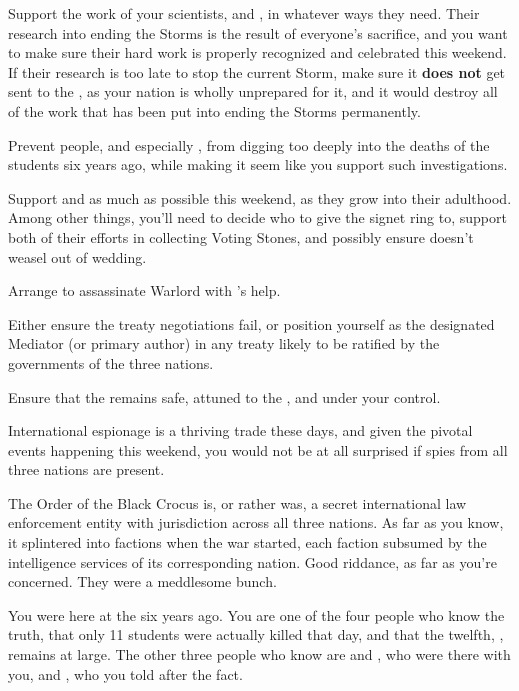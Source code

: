 \documentclass[char]{GL2020}
\begin{document}
\begin{itemz}
    \item Support the work of your scientists, \cHeadScientist{} and \cAssistantScientist{}, in whatever ways they need. Their research into ending the Storms is the result of everyone's sacrifice, and you want to make sure their hard work is properly recognized and celebrated this weekend. If their research is too late to stop the current Storm, make sure it \textbf{does not} get sent to the \pTech{}, as your nation is wholly unprepared for it, and it would destroy all of the work that has been put into ending the Storms permanently.
    \item Prevent people, and especially \cHeir{}, from digging too deeply into the deaths of the students six years ago, while making it seem like you support such investigations.
    \item Support \cHeir{} and \cAmbition{} as much as possible this weekend, as they grow into their adulthood. Among other things, you’ll need to decide who to give the signet ring to, support both of their efforts in collecting Voting Stones, and possibly ensure \cHeir{} doesn’t weasel out of \cHeir{\their} wedding.
    \item Arrange to assassinate Warlord \cLoud{} with \cEvil{}'s help.
    \item Either ensure the treaty negotiations fail, or position yourself as the designated Mediator (or primary author) in any treaty likely to be ratified by the governments of the three nations.
    \item Ensure that the \iMirror{} remains safe, attuned to the \pTech{}, and under your control.
\end{itemz}

\begin{itemz}[Notes]
    \item International espionage is a thriving trade these days, and given the pivotal events happening this weekend, you would not be at all surprised if spies from all three nations are present.
    \item The Order of the Black Crocus is, or rather was, a secret international law enforcement entity with jurisdiction across all three nations. As far as you know, it splintered into factions when the war started, each faction subsumed by the intelligence services of its corresponding nation. Good riddance, as far as you're concerned. They were a meddlesome bunch.
    \item You were here at the \pSchool{} six years ago. You are one of the four people who know the truth, that only 11 students were actually killed that day, and that the twelfth, \cKidScientist{\full}, remains at large. The other three people who know are \cMusic{\full} and \cPrincipal{\full}, who were there with you, and \cEvil{}, who you told after the fact.
\end{itemz}
\end{document}
